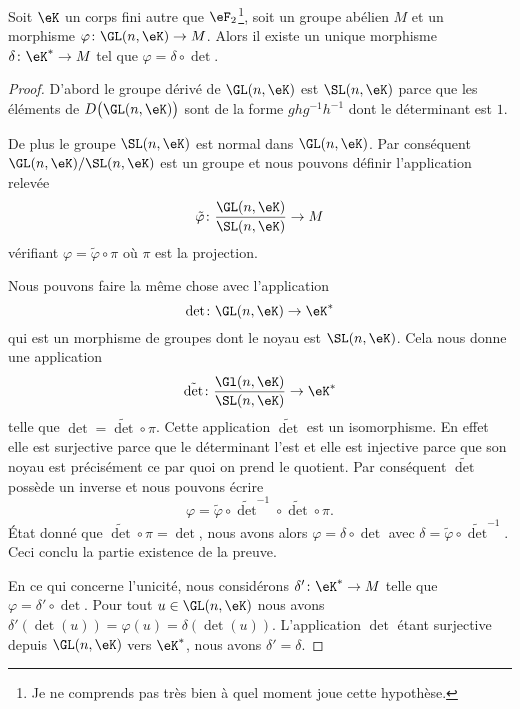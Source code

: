 \begin{lemma}   \label{LemcDOTzM}
    Soit \( \eK\) un corps fini autre que \( \eF_2\)\footnote{Je ne comprends pas très bien à quel moment joue cette hypothèse.}, soit un groupe abélien \( M\) et un morphisme \( \varphi\colon \GL(n,\eK)\to M\). Alors il existe un unique morphisme \( \delta\colon \eK^*\to M\) tel que \( \varphi=\delta\circ\det\).
\end{lemma}

\begin{proof}
    D'abord le groupe dérivé de \( \GL(n,\eK)\) est \( \SL(n,\eK)\) parce que les éléments de \( D\big( \GL(n,\eK) \big)\) sont de la forme \( ghg^{-1}h^{-1}\) dont le déterminant est \( 1\).
    
    De plus le groupe \( \SL(n,\eK)\) est normal dans \( \GL(n,\eK)\). Par conséquent \( \GL(n,\eK)/\SL(n,\eK)\) est un groupe et nous pouvons définir l'application relevée
    \begin{equation}
        \tilde \varphi\colon \frac{ \GL(n,\eK) }{ \SL(n,\eK) }\to M
    \end{equation}
    vérifiant \( \varphi=\tilde \varphi\circ\pi\) où \( \pi\) est la projection. 

    Nous pouvons faire la même chose avec l'application
    \begin{equation}
        \det\colon \GL(n,\eK)\to \eK^*
    \end{equation}
    qui est un morphisme de groupes dont le noyau est \( \SL(n,\eK)\). Cela nous donne une application
    \begin{equation}
        \tilde \det\colon \frac{ \Gl(n,\eK) }{ \SL(n,\eK) }\to \eK^*
    \end{equation}
    telle que \( \det=\tilde \det\circ\pi\). Cette application \( \tilde \det\) est un isomorphisme. En effet elle est surjective parce que le déterminant l'est et elle est injective parce que son noyau est précisément ce par quoi on prend le quotient. Par conséquent \( \tilde \det \) possède un inverse et nous pouvons écrire
    \begin{equation}
        \varphi=\tilde \varphi\circ\tilde \det^{-1}\circ\tilde \det\circ\pi.
    \end{equation}
    État donné que \( \tilde \det\circ\pi=\det\), nous avons alors \( \varphi=\delta\circ\det\) avec \( \delta=\tilde \varphi\circ\tilde \det^{-1}\). Ceci conclu la partie existence de la preuve.

    En ce qui concerne l'unicité, nous considérons \( \delta'\colon \eK^*\to M\) telle que \( \varphi=\delta'\circ\det\). Pour tout \( u\in \GL(n,\eK)\) nous avons \( \delta'(\det(u))=\varphi(u)=\delta(\det(u))\). L'application \( \det\) étant surjective depuis \( \GL(n,\eK)\) vers \( \eK^*\), nous avons \( \delta'=\delta\).
\end{proof}

